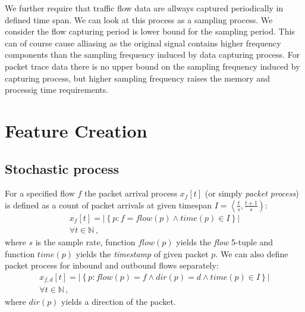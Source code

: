 We further require that traffic flow data are allways captured periodically in defined time span.
We can look at this process as a sampling process. We consider the flow capturing period
is lower bound for the sampling period. This can of course cause alliasing as the original
signal contains higher frequency components than the sampling frequency induced by data capturing 
process. For packet trace data there is no upper bound on the sampling frequency induced by 
capturing process, but higher sampling frequency raises the memory and processig time requirements.


\section{Feature Creation}

\subsection{Stochastic process}

For a specified flow $f$ the packet arrival process $x_f\left[t\right]$ 
(or simply \emph{packet process})  is defined as a count of packet arrivals 
at given timespan $I = \left\langle \frac{t}{s}, \frac{t+1}{s} \right)$:
\begin{equation}\label{packetprocess}
\begin{split}
	 x_f\left[t\right] = \left| 
	\left\lbrace p : f = flow(p) \wedge time(p) \in I \right\rbrace \right|\\
	\forall t \in \mathbb{N}\, ,
\end{split}
\end{equation}
where $s$ is the sample rate, function $flow(p)$  yields the \emph{flow} 5-tuple 
and function $time(p)$  yields the \emph{timestamp} of given packet $p$. 
We can also define packet process for inbound and outbound flows separately:
\begin{equation}\label{xpacketprocess}
\begin{split}
  x_{f,d}\left[t\right] = \left| 
  \left\lbrace p : flow(p) = f \wedge dir(p) = d \wedge time(p) \in I  \right\rbrace \right|\\
  \forall t \in \mathbb{N}\, ,
\end{split}
\end{equation}%
where $dir(p)$ yields a direction of the packet. 

